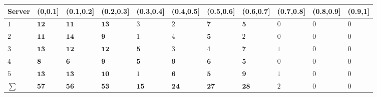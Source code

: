
\begin{tabular}{l|l|l|l|l|l|l|l|l|l|l}
\hline
Server & (0,0.1] & (0.1,0.2] & (0.2,0.3] & (0.3,0.4] & (0.4,0.5] & (0.5,0.6] & (0.6,0.7] & (0.7,0.8] & (0.8,0.9] & (0.9,1]\\
\hline
$1$ & $\bm{12}$ & $\bm{11}$ & $\bm{13}$ & $3$ & $2$ & $\bm{7}$ & $\bm{5}$ & $0$ & $0$ & $0$\\
\hline
$2$ & $\bm{11}$ & $\bm{14}$ & $\bm{9}$ & $1$ & $4$ & $\bm{5}$ & $2$ & $0$ & $0$ & $0$\\
\hline
$3$ & $\bm{13}$ & $\bm{12}$ & $\bm{12}$ & $\bm{5}$ & $3$ & $4$ & $\bm{7}$ & $1$ & $0$ & $0$\\
\hline
$4$ & $\bm{8}$ & $\bm{6}$ & $\bm{9}$ & $\bm{5}$ & $\bm{9}$ & $\bm{6}$ & $\bm{5}$ & $0$ & $0$ & $0$\\
\hline
$5$ & $\bm{13}$ & $\bm{13}$ & $\bm{10}$ & $1$ & $\bm{6}$ & $\bm{5}$ & $\bm{9}$ & $1$ & $0$ & $0$\\
\hline
$\sum$ & $\bm{57}$ & $\bm{56}$ & $\bm{53}$ & $\bm{15}$ & $\bm{24}$ & $\bm{27}$ & $\bm{28}$ & $2$ & $0$ & $0$\\
\hline
\end{tabular}
